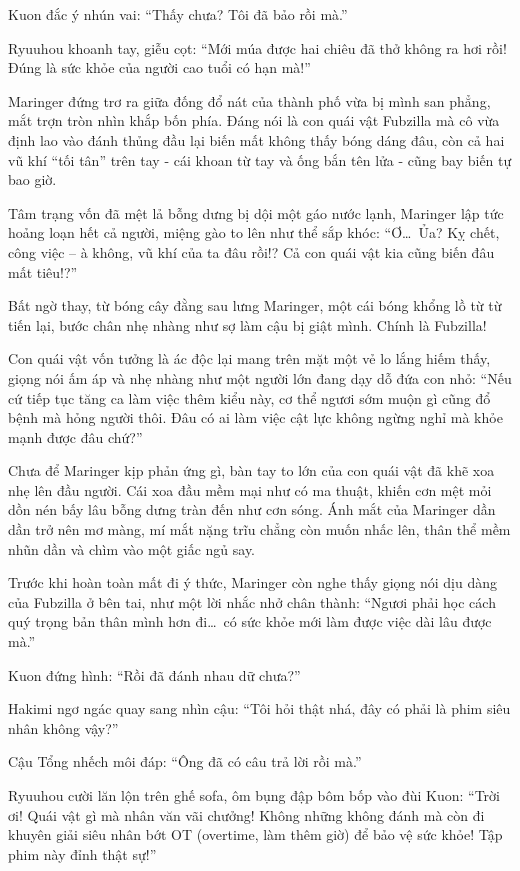 \documentclass[../main.tex]{subfiles}
\begin{document}
Kuon đắc ý nhún vai: ``Thấy chưa? Tôi đã bảo rồi mà.''

Ryuuhou khoanh tay, giễu cọt: ``Mới múa được hai chiêu đã thở không ra hơi rồi! Đúng là sức khỏe của người cao tuổi có hạn mà!''

Maringer đứng trơ ra giữa đống đổ nát của thành phố vừa bị mình san phẳng, mắt trợn tròn nhìn khắp bốn phía. Đáng nói là con quái vật Fubzilla mà cô vừa định lao vào đánh thủng đầu lại biến mất không thấy bóng dáng đâu, còn cả hai vũ khí ``tối tân'' trên tay - cái khoan từ tay và ống bắn tên lửa - cũng bay biến tự bao giờ.

Tâm trạng vốn đã mệt lả bỗng dưng bị dội một gáo nước lạnh, Maringer lập tức hoảng loạn hết cả người, miệng gào to lên như thể sắp khóc: ``Ơ\dots\ Ủa? Kỵ chết, công việc -- à không, vũ khí của ta đâu rồi!? Cả con quái vật kia cũng biến đâu mất tiêu!?''

Bất ngờ thay, từ bóng cây đằng sau lưng Maringer, một cái bóng khổng lồ từ từ tiến lại, bước chân nhẹ nhàng như sợ làm cậu bị giật mình. Chính là Fubzilla!

Con quái vật vốn tưởng là ác độc lại mang trên mặt một vẻ lo lắng hiếm thấy, giọng nói ấm áp và nhẹ nhàng như một người lớn đang dạy dỗ đứa con nhỏ: ``Nếu cứ tiếp tục tăng ca làm việc thêm kiểu này, cơ thể ngươi sớm muộn gì cũng đổ bệnh mà hỏng người thôi. Đâu có ai làm việc cật lực không ngừng nghỉ mà khỏe mạnh được đâu chứ?''

Chưa để Maringer kịp phản ứng gì, bàn tay to lớn của con quái vật đã khẽ xoa nhẹ lên đầu người. Cái xoa đầu mềm mại như có ma thuật, khiến cơn mệt mỏi dồn nén bấy lâu bỗng dưng tràn đến như cơn sóng. Ánh mắt của Maringer dần dần trở nên mơ màng, mí mắt nặng trĩu chẳng còn muốn nhấc lên, thân thể mềm nhũn dần và chìm vào một giấc ngủ say.

Trước khi hoàn toàn mất đi ý thức, Maringer còn nghe thấy giọng nói dịu dàng của Fubzilla ở bên tai, như một lời nhắc nhở chân thành: ``Ngươi phải học cách quý trọng bản thân mình hơn đi\dots\ có sức khỏe mới làm được việc dài lâu được mà.''


Kuon đứng hình: ``Rồi đã đánh nhau dữ chưa?''

Hakimi ngơ ngác quay sang nhìn cậu: ``Tôi hỏi thật nhá, đây có phải là phim siêu nhân không vậy?''

Cậu Tổng nhếch môi đáp: ``Ông đã có câu trả lời rồi mà.''

Ryuuhou cười lăn lộn trên ghế sofa, ôm bụng đập bôm bốp vào đùi Kuon: ``Trời ơi! Quái vật gì mà nhân văn vãi chưởng! Không những không đánh mà còn đi khuyên giải siêu nhân bớt OT (overtime, làm thêm giờ) để bảo vệ sức khỏe! Tập phim này đỉnh thật sự!''
\end{document}
